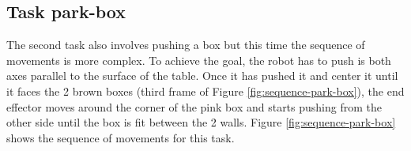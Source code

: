 \subsection{Task park-box}
\label{subsection:Park a box}

The second task also involves pushing a box but this time the sequence of movements is more complex. To achieve the goal, the robot has to push is both axes parallel to the surface of the table. Once it has pushed it and center it until it faces the 2 brown boxes (third frame of Figure \ref{fig:sequence-park-box}), the end effector moves around the corner of the pink box and starts pushing from the other side until the box is fit between the 2 walls. Figure \ref{fig:sequence-park-box} shows the sequence of movements for this task.


 \begin{figure}[H]
  \centering
   \hfill
   \hfill
   \hfill
   \hfill

\end{figure}
